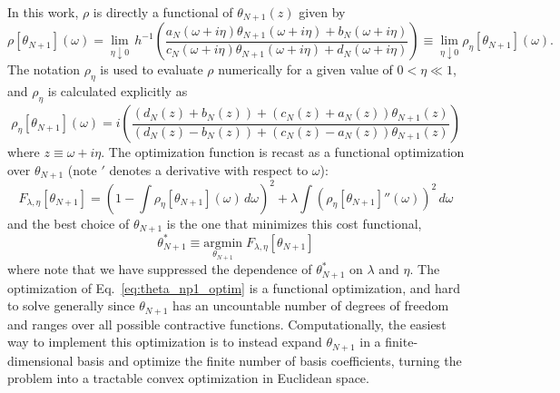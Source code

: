 In this work, $\rho$ is directly a functional of $\theta_{N+1}(z)$ given by
\begin{equation}
    \rho[\theta_{N+1}](\omega) = \lim_{\eta\downarrow 0}\, h^{-1}\left( \frac{a_N(\omega + i\eta) \theta_{N+1}(\omega+ i\eta) + b_N(\omega+ i\eta)}{c_N(\omega+ i\eta) \theta_{N+1}(\omega+ i\eta) + d_N(\omega+ i\eta)} \right) \equiv \lim_{\eta\downarrow 0}\rho_\eta[\theta_{N+1}](\omega).
\end{equation}
The notation $\rho_\eta$ is used to evaluate $\rho$ numerically for a given value of $0 < \eta\ll 1$, and $\rho_\eta$ is calculated explicitly as
\begin{equation}
    \rho_\eta[\theta_{N+1}](\omega) = i \left( \frac{ (d_N(z) + b_N(z)) + (c_N(z) + a_N(z)) \theta_{N+1}(z) }{ (d_N(z) - b_N(z)) + (c_N(z) - a_N(z)) \theta_{N+1}(z) } \right)
\end{equation}
where $z \equiv \omega + i\eta$. The optimization function is recast as a functional optimization over $\theta_{N+1}$ (note $\prime$ denotes a derivative with respect to $\omega$):
\begin{equation}
    F_{\lambda, \eta}[\theta_{N+1}] = \left( 1 - \int \rho_\eta[\theta_{N+1}](\omega)\,d\omega \right)^2 + \lambda \int \left( \rho_\eta[\theta_{N+1}]''(\omega) \right)^2\,d\omega
\end{equation}
and the best choice of $\theta_{N+1}$ is the one that minimizes this cost functional,
\begin{equation}
    \theta_{N+1}^*\equiv \underset{\theta_{N+1}}{\mathrm{argmin}} \; F_{\lambda, \eta}[\theta_{N+1}]
    \label{eq:theta_np1_optim}
\end{equation}
where note that we have suppressed the dependence of $\theta_{N+1}^*$ on $\lambda$ and $\eta$. The optimization of Eq.~\eqref{eq:theta_np1_optim} is a functional optimization, and hard to solve generally since $\theta_{N+1}$ has an uncountable number of degrees of freedom and ranges over all possible contractive functions. Computationally, the easiest way to implement this optimization is to instead expand $\theta_{N+1}$ in a finite-dimensional basis and optimize the finite number of basis coefficients, turning the problem into a tractable convex optimization in Euclidean space. 

